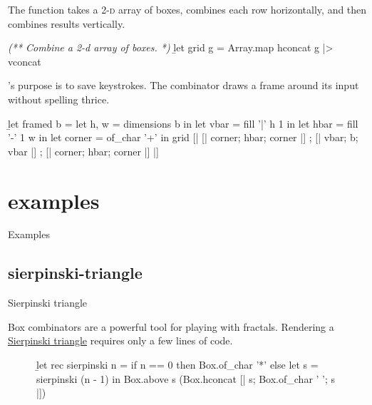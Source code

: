 \documentclass{article}
\begin{document}
The \href{#ref-grid}{} function takes a \textsc{2-d} array of boxes,
combines each row horizontally,
and then combines results vertically.

\begin{code}[ocaml]
\emph{(** Combine a 2-d array of boxes. *)}
\b{let} grid g = Array.map hconcat g |> vconcat\label{ref-grid}
\end{code}

's purpose is to save keystrokes.
The  combinator draws a frame around its input
without spelling  thrice.

\begin{code}[ocaml]
\b{let} framed b =
    let h, w = dimensions b in
    let vbar = fill '|' h 1 in
    let hbar = fill '-' 1 w in
    let corner = of_char '+' in
    grid [| [| corner; hbar; corner |]
          ; [| vbar;   b;    vbar   |]
          ; [| corner; hbar; corner |] |]
\end{code}

\section{examples}{Examples}
\subsection{sierpinski-triangle}{Sierpinski triangle}

Box combinators are a powerful tool for playing with fractals.
Rendering a \href{https://en.wikipedia.org/wiki/Sierpi%C5%84ski_triangle}{Sierpinski triangle} requires only a few lines of code.

\begin{figure}
\begin{code}[ocaml]
\b{let rec} sierpinski n =
    if n == 0 then Box.of_char '*'
    else let s = sierpinski (n - 1) in
         Box.above s (Box.hconcat [| s; Box.of_char ' '; s |])
\end{code}
\end{figure}
\end{document}
